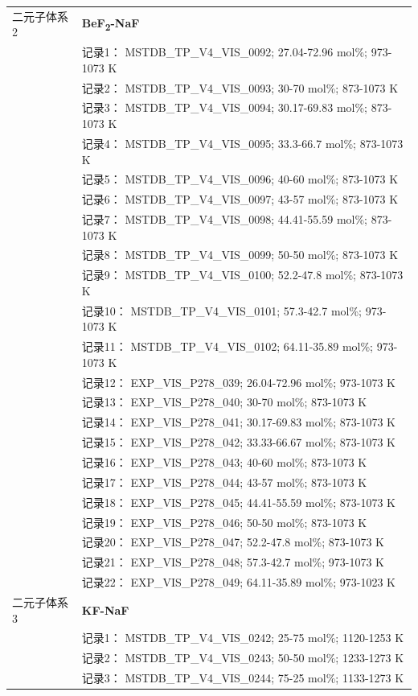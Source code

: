 \documentclass[12pt]{article}
\begin{document}
{\begin{longtable}[]{@{}
  >{\raggedright\arraybackslash}p{}
  >{\raggedright\arraybackslash}p{}@{}}
二元子体系 2  & \textbf{BeF\textsubscript{2}-NaF} \\
 & 记录1： MSTDB\_TP\_V4\_VIS\_0092; 27.04-72.96 mol\%; 973-1073 K \\
 & 记录2： MSTDB\_TP\_V4\_VIS\_0093; 30-70 mol\%; 873-1073 K \\
 & 记录3： MSTDB\_TP\_V4\_VIS\_0094; 30.17-69.83 mol\%; 873-1073 K \\
 & 记录4： MSTDB\_TP\_V4\_VIS\_0095; 33.3-66.7 mol\%; 873-1073 K \\
 & 记录5： MSTDB\_TP\_V4\_VIS\_0096; 40-60 mol\%; 873-1073 K \\
 & 记录6： MSTDB\_TP\_V4\_VIS\_0097; 43-57 mol\%; 873-1073 K \\
 & 记录7： MSTDB\_TP\_V4\_VIS\_0098; 44.41-55.59 mol\%; 873-1073 K \\
 & 记录8： MSTDB\_TP\_V4\_VIS\_0099; 50-50 mol\%; 873-1073 K \\
 & 记录9： MSTDB\_TP\_V4\_VIS\_0100; 52.2-47.8 mol\%; 873-1073 K \\
 & 记录10： MSTDB\_TP\_V4\_VIS\_0101; 57.3-42.7 mol\%; 973-1073 K \\
 & 记录11： MSTDB\_TP\_V4\_VIS\_0102; 64.11-35.89 mol\%; 973-1073 K \\
 & 记录12： EXP\_VIS\_P278\_039; 26.04-72.96 mol\%; 973-1073 K \\
 & 记录13： EXP\_VIS\_P278\_040; 30-70 mol\%; 873-1073 K \\
 & 记录14： EXP\_VIS\_P278\_041; 30.17-69.83 mol\%; 873-1073 K \\
 & 记录15： EXP\_VIS\_P278\_042; 33.33-66.67 mol\%; 873-1073 K \\
 & 记录16： EXP\_VIS\_P278\_043; 40-60 mol\%; 873-1073 K \\
 & 记录17： EXP\_VIS\_P278\_044; 43-57 mol\%; 873-1073 K \\
 & 记录18： EXP\_VIS\_P278\_045; 44.41-55.59 mol\%; 873-1073 K \\
 & 记录19： EXP\_VIS\_P278\_046; 50-50 mol\%; 873-1073 K \\
 & 记录20： EXP\_VIS\_P278\_047; 52.2-47.8 mol\%; 873-1073 K \\
 & 记录21： EXP\_VIS\_P278\_048; 57.3-42.7 mol\%; 973-1073 K \\
 & 记录22： EXP\_VIS\_P278\_049; 64.11-35.89 mol\%; 973-1023 K  \\

二元子体系 3  & \textbf{KF-NaF} \\
 & 记录1： MSTDB\_TP\_V4\_VIS\_0242; 25-75 mol\%; 1120-1253 K \\
 & 记录2： MSTDB\_TP\_V4\_VIS\_0243; 50-50 mol\%; 1233-1273 K \\
 & 记录3： MSTDB\_TP\_V4\_VIS\_0244; 75-25 mol\%; 1133-1273 K  \\


\end{longtable}}
\end{document}

